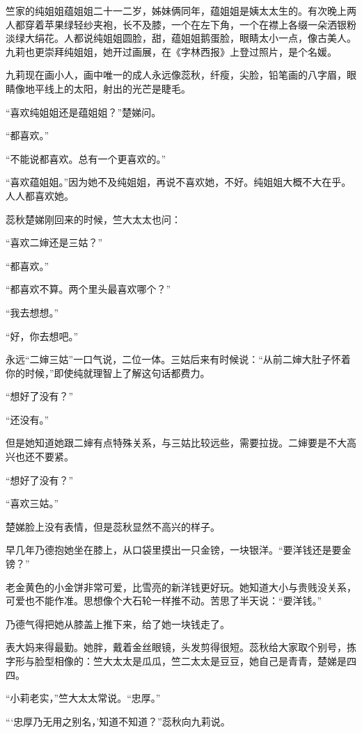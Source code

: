 \par 竺家的纯姐姐蕴姐姐二十一二岁，姊妹俩同年，蕴姐姐是姨太太生的。有次晚上两人都穿着苹果绿轻纱夹袍，长不及膝，一个在左下角，一个在襟上各缀一朵洒银粉淡绿大绢花。人都说纯姐姐圆脸，甜，蕴姐姐鹅蛋脸，眼睛太小一点，像古美人。九莉也更崇拜纯姐姐，她开过画展，在《字林西报》上登过照片，是个名媛。
\par 九莉现在画小人，画中唯一的成人永远像蕊秋，纤瘦，尖脸，铅笔画的八字眉，眼睛像地平线上的太阳，射出的光芒是睫毛。
\par “喜欢纯姐姐还是蕴姐姐？”楚娣问。
\par “都喜欢。”
\par “不能说都喜欢。总有一个更喜欢的。”
\par “喜欢蕴姐姐。”因为她不及纯姐姐，再说不喜欢她，不好。纯姐姐大概不大在乎。人人都喜欢她。
\par 蕊秋楚娣刚回来的时候，竺大太太也问：
\par “喜欢二婶还是三姑？”
\par “都喜欢。”
\par “都喜欢不算。两个里头最喜欢哪个？”
\par “我去想想。”
\par “好，你去想吧。”
\par 永远“二婶三姑”一口气说，二位一体。三姑后来有时候说：“从前二婶大肚子怀着你的时候，”即使纯就理智上了解这句话都费力。
\par “想好了没有？”
\par “还没有。”
\par 但是她知道她跟二婶有点特殊关系，与三姑比较远些，需要拉拢。二婶要是不大高兴也还不要紧。
\par “想好了没有？”
\par “喜欢三姑。”
\par 楚娣脸上没有表情，但是蕊秋显然不高兴的样子。
\par 早几年乃德抱她坐在膝上，从口袋里摸出一只金镑，一块银洋。“要洋钱还是要金镑？”
\par 老金黄色的小金饼非常可爱，比雪亮的新洋钱更好玩。她知道大小与贵贱没关系，可爱也不能作准。思想像个大石轮一样推不动。苦思了半天说：“要洋钱。”
\par 乃德气得把她从膝盖上推下来，给了她一块钱走了。
\par 表大妈来得最勤。她胖，戴着金丝眼镜，头发剪得很短。蕊秋给大家取个别号，拣字形与脸型相像的：竺大太太是瓜瓜，竺二太太是豆豆，她自己是青青，楚娣是四四。
\par “小莉老实，”竺大太太常说。“忠厚。”
\par “‘忠厚乃无用之别名，’知道不知道？”蕊秋向九莉说。

